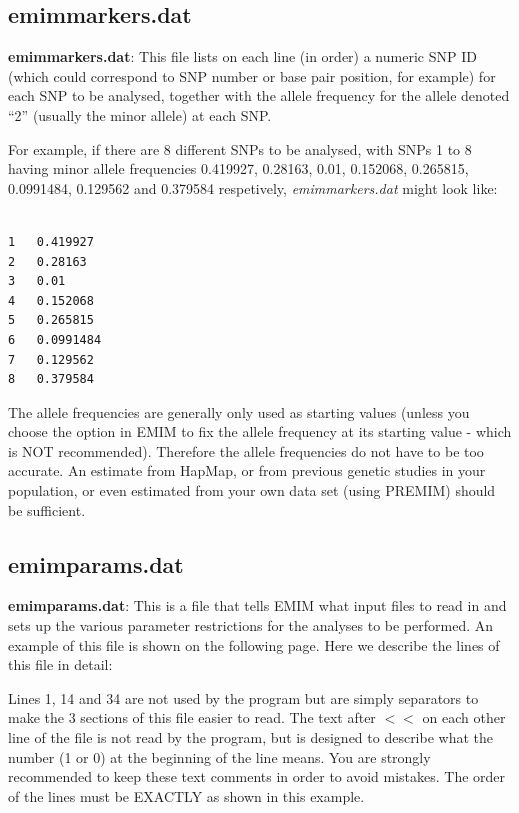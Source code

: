 \documentclass[a4paper,12pt]{article}
\begin{document}
\subsection{emimmarkers.dat}
\label{emimmarkers}

{\bf emimmarkers.dat}: This file lists on each line (in order) a numeric SNP ID (which could correspond to SNP number or base pair position, for example) for each SNP to be analysed, together with the allele frequency for the allele denoted ``2'' (usually the minor allele) at each SNP. 

For example, if there are 8 different SNPs to be analysed, with SNPs 1 to 8 having minor allele frequencies 0.419927, 0.28163, 0.01, 0.152068, 0.265815, 0.0991484, 0.129562 and 0.379584 respetively, {\it emimmarkers.dat} might look like: 
\vspace{0.35cm} \begin{lstlisting}

1	0.419927
2	0.28163
3	0.01
4	0.152068
5	0.265815
6	0.0991484
7	0.129562
8	0.379584

\end{lstlisting} \vspace{0.35cm}
The allele frequencies are generally only used as starting values (unless you choose the option in EMIM to fix the allele frequency at its starting value - which is NOT recommended). Therefore the allele frequencies do not have to be too accurate. An estimate from HapMap, or from previous genetic studies in your population, or even estimated from your own data set (using PREMIM) should be sufficient. 


\subsection{emimparams.dat}
\label{emimparams}

{\bf emimparams.dat}: This is a file that tells EMIM what input files to read in and sets up the various parameter restrictions for the analyses to be performed. An example of this file is shown on the following page. Here we describe the lines of this file in detail: 

Lines 1, 14 and 34 are not used by the program but are simply separators to make the 3 sections of this file easier to read. The text after $<<$ on each other line of the file is not read by the program, but is designed to describe what the number (1 or 0) at the beginning of the line means. You are strongly recommended to keep these text comments in order to avoid mistakes. The order of the lines must be EXACTLY as shown in this example. 
\end{document}
